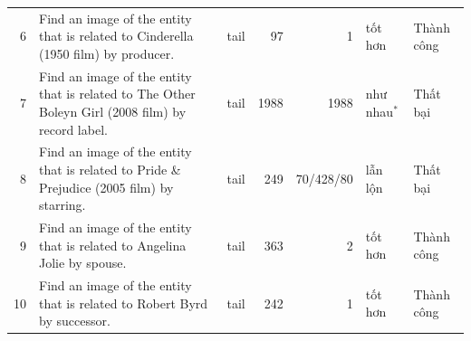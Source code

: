 \begin{table}[!t]
\begin{tabularx}{\linewidth}{@{}rYlrrll@{}}
6 & Find an image of the entity that is related to Cinderella (1950 film) by producer. & tail & 97 & 1 & tốt hơn & Thành công\\
7 & Find an image of the entity that is related to The Other Boleyn Girl (2008 film) by record label. & tail & 1988 & 1988 & như nhau$^{*}$ & Thất bại\\
8 & Find an image of the entity that is related to Pride \& Prejudice (2005 film) by starring. & tail & 249 & 70/428/80 & lẫn lộn & Thất bại\\
9 & Find an image of the entity that is related to Angelina Jolie by spouse. & tail & 363 & 2 & tốt hơn & Thành công\\
10 & Find an image of the entity that is related to Robert Byrd by successor. & tail & 242 & 1 & tốt hơn & Thành công\\
\bottomrule
\end{tabularx}
\par{}
\end{table}

